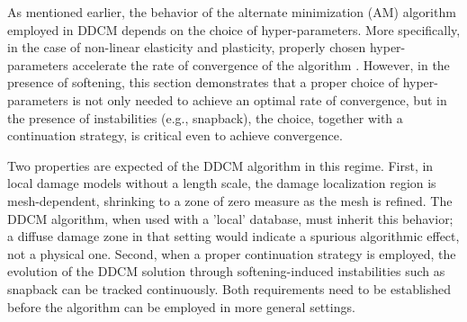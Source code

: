 \documentclass[10pt]{cas-sc}
\newenvironment{addedblock}
{\begingroup\color{blue!80}}
{\endgroup}
\begin{document}
\begin{addedblock}
As mentioned earlier, the behavior of the alternate minimization (AM) algorithm employed in DDCM depends on the choice of hyper-parameters. More specifically, in the case of non-linear elasticity and plasticity, properly chosen hyper-parameters accelerate the rate of convergence of the algorithm \cite{Nguyen2022,Pham2023}. However, in the presence of softening, this section demonstrates that a proper choice of hyper-parameters is not only needed to achieve an optimal rate of convergence, but in the presence of instabilities (e.g., snapback), the choice, together with a continuation strategy, is critical even to achieve convergence.

Two properties are expected of the DDCM algorithm in this regime. First, in local damage models without a length scale, the damage localization region is mesh-dependent, shrinking to a zone of zero measure as the mesh is refined. The DDCM algorithm, when used with a 'local' database, must inherit this behavior; a diffuse damage zone in that setting would indicate a spurious algorithmic effect, not a physical one. Second, when a proper continuation strategy is employed, the evolution of the DDCM solution through softening-induced instabilities such as snapback can be tracked continuously. Both requirements need to be established before the algorithm can be employed in more general settings.





\end{addedblock}
\end{document}

